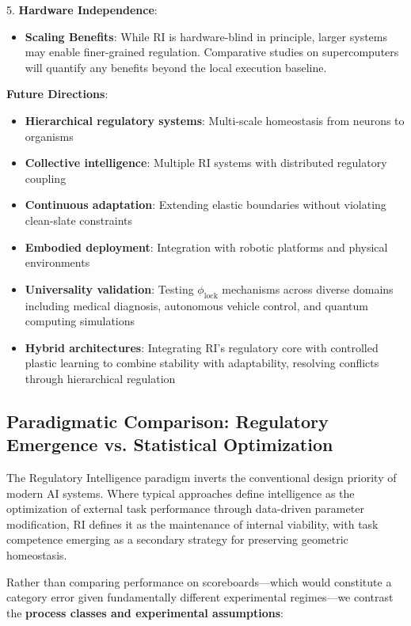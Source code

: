 \documentclass[12pt,a4paper]{report}
\begin{document}
5. \textbf{Hardware Independence}:
\begin{itemize}
   \item\textbf{Scaling Benefits}: While RI is hardware-blind in principle, larger systems may enable finer-grained regulation. Comparative studies on supercomputers will quantify any benefits beyond the local execution baseline.
\end{itemize}

\textbf{Future Directions}:
\begin{itemize}
    \item \textbf{Hierarchical regulatory systems}: Multi-scale homeostasis from neurons to organisms
    \item \textbf{Collective intelligence}: Multiple RI systems with distributed regulatory coupling
    \item \textbf{Continuous adaptation}: Extending elastic boundaries without violating clean-slate constraints
    \item \textbf{Embodied deployment}: Integration with robotic platforms and physical environments
    \item \textbf{Universality validation}: Testing \(\phi_{\text{lock}}\) mechanisms across diverse domains including medical diagnosis, autonomous vehicle control, and quantum computing simulations
    \item \textbf{Hybrid architectures}: Integrating RI's regulatory core with controlled plastic learning to combine stability with adaptability, resolving conflicts through hierarchical regulation
\end{itemize}

\subsection{Paradigmatic Comparison: Regulatory Emergence vs. Statistical Optimization}

The Regulatory Intelligence paradigm inverts the conventional design priority of modern AI systems. Where typical approaches define intelligence as the optimization of external task performance through data-driven parameter modification, RI defines it as the maintenance of internal viability, with task competence emerging as a secondary strategy for preserving geometric homeostasis.

Rather than comparing performance on scoreboards—which would constitute a category error given fundamentally different experimental regimes—we contrast the \textbf{process classes and experimental assumptions}:
\end{document}
